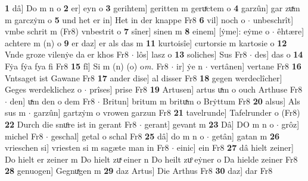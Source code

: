 \documentclass[8pt,a4paper,notitlepage]{article}
\begin{document}
\begin{table}[ht]
\begin{minipage}[t]{0.5\linewidth}
\textbf{1} dâ] Do m n o \textbf{2} er] eyn o \textbf{3} gerihtem] geritten m geruͯctem o \textbf{4} garzûn] gar zuͯm m garczẏm o \textbf{5} und het er in] Het in der knappe Fr8 \textbf{6} vil] noch o  $\cdot$ unbeschrît] vmbe schrit m (Fr8) vnbestrit o \textbf{7} sîner] sinen m \textbf{8} einem] [ẏme]: eẏme o  $\cdot$ êhtære] achtere m (n) o \textbf{9} er daz] er als das m \textbf{11} kurtoisîe] curtorsie m kartosie o \textbf{12} Vnde groze vilenẏe da er khos Fr8  $\cdot$ lôs] lasz o \textbf{13} soliches] Sus Fr8  $\cdot$ des] das o \textbf{14} Fẏa fẏa fya fi Fr8 \textbf{15} fî] Si m (n) (o) o\textit{m. } Fr8  $\cdot$ ir] ẏe n  $\cdot$ vertânen] vertane Fr8 \textbf{16} Vntsaget ist Gawane Fr8 \textbf{17} ander dise] al disser Fr8 \textbf{18} gegen werdeclîcher] Geges werdeklichez o  $\cdot$ prîses] prise Fr8 \textbf{19} Artusen] artus uͯm o ouch Arthuse Fr8  $\cdot$ den] uͯm den o dem Fr8  $\cdot$ Britun] britum m brituͯm o Brẏttum Fr8 \textbf{20} alsus] Als sus m  $\cdot$ garzûn] gartzẏm o vrowen garzun Fr8 \textbf{21} tavelrunde] Tafelrunder o (Fr8) \textbf{22} Durch die snuͦre ist in gerant Fr8  $\cdot$ gerant] gevant m \textbf{23} Dâ] DO m n o  $\cdot$ grôz] michel Fr8  $\cdot$ geschal] getal o schal Fr8 \textbf{25} dâ] do m n o  $\cdot$ getân] gatan m \textbf{26} vrieschen si] vriesten si m sagæte man in Fr8  $\cdot$ einic] ein Fr8 \textbf{27} dâ hielt zeiner] Do hielt er zeiner m Do hielt zuͯ einer n Do heilt zuͦ eẏner o Da hielde zeiner Fr8 \textbf{28} genuogen] Gegnuͯgen m \textbf{29} daz Artus] Die Arthus Fr8 \textbf{30} daz] dar Fr8 \newline
\end{minipage}
\end{table}
\newpage
\end{document}
